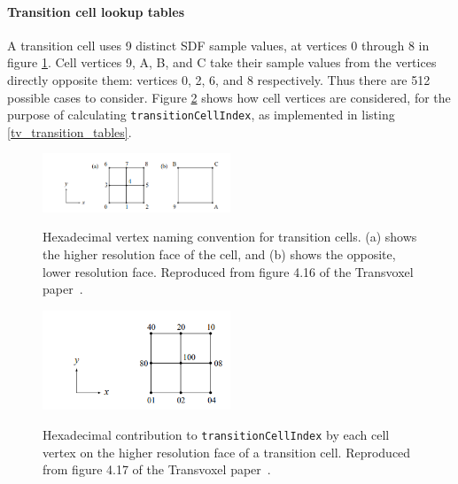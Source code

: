 \documentclass[11pt]{article}
\begin{document}
\paragraph{Transition cell lookup tables}

A transition cell uses 9 distinct SDF sample values, at vertices 0 through 8 in figure \ref{fig:tv_transition_labels}. Cell vertices 9, A, B, and C take their sample values from the vertices directly opposite them: vertices 0, 2, 6, and 8 respectively. Thus there are 512 possible cases to consider. Figure \ref{fig:tv_transition_cellIndex} shows how cell vertices are considered, for the purpose of calculating \texttt{transitionCellIndex}, as implemented in listing \ref{tv_transition_tables}.

\begin{figure}
  \caption{Hexadecimal vertex naming convention for transition cells. (a) shows the higher resolution face of the cell, and (b) shows the opposite, lower resolution face. Reproduced from figure 4.16 of the Transvoxel paper~\cite{lengyel_2010}.}
  \includegraphics[width=0.5\textwidth]{tv_transition_labels.PNG}
  \label{fig:tv_transition_labels}
\end{figure}

\begin{figure}
  \caption{Hexadecimal contribution to \texttt{transitionCellIndex} by each cell vertex on the higher resolution face of a transition cell. Reproduced from figure 4.17 of the Transvoxel paper~\cite{lengyel_2010}.}
  \includegraphics[width=0.5\textwidth]{tv_transition_cellIndex.PNG}
  \label{fig:tv_transition_cellIndex}
\end{figure}

\pagebreak
\end{document}
